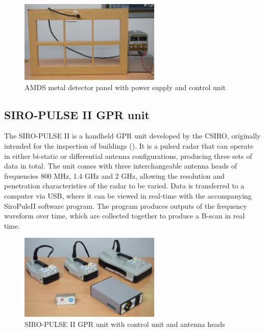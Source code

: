 \documentclass[main.tex]{subfiles}
\begin{document}
\begin{figure}[ht]
\includegraphics[width=0.6\textwidth]{3-ConceptDesign/AMDS.JPG}
\centering
\caption{AMDS metal detector panel with power supply and control unit} 
\end{figure}

\subsection{SIRO-PULSE II GPR unit}
The SIRO-PULSE II is a handheld GPR unit developed by the CSIRO, originally intended for the inspection of buildings (). It is a pulsed radar that can operate in either bi-static or differential antenna configurations, producing three sets of data in total. The unit comes with three interchangeable antenna heads of frequencies 800 MHz, 1.4 GHz and 2 GHz, allowing the resolution and penetration characteristics of the radar to be varied. Data is transferred to a computer via USB, where it can be viewed in real-time with the accompanying SiroPuleII software program. The program produces outputs of the frequency waveform over time, which are collected together to produce a B-scan in real time. 

\begin{figure}[ht]
\includegraphics[width=0.6\textwidth]{3-ConceptDesign/SiroPulse.JPG}
\centering
\caption{SIRO-PULSE II GPR unit with control unit and antenna heads} 
\end{figure}
\end{document}

